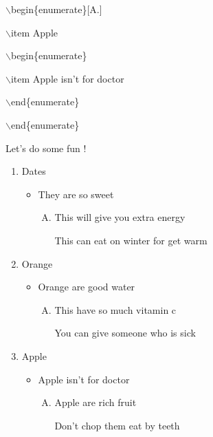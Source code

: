 \documentclass[11pt]{article}
\begin{document}
$\backslash$begin\{enumerate\}[A.]

$\backslash$item Apple

$\backslash$begin\{enumerate\}

$\backslash$item Apple isn't for doctor

$\backslash$end\{enumerate\}

$\backslash$end\{enumerate\}

\vspace{1cm}

Let's do some fun !

\begin{enumerate}
\item Dates
\begin{itemize}
\item They are so sweet
\begin{enumerate}[A.]
\item This will give you extra energy
\item[This can eat on winter for get warm]
\end{enumerate}
\end{itemize}
\item Orange
\begin{itemize}
\item Orange are good water
\begin{enumerate}[A.]
\item This have so much vitamin c
\item[You can give someone who is sick]
\end{enumerate}
\end{itemize}
\item Apple
\begin{itemize}
\item Apple isn't for doctor
\begin{enumerate}[A.]
\item Apple are rich fruit
\item[Don't chop them eat by teeth]
\end{enumerate}
\end{itemize}
\end{enumerate}

\pagebreak
\end{document}
